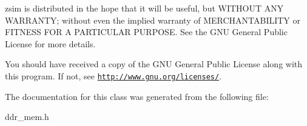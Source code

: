 zsim is distributed in the hope that it will be useful, but W\-I\-T\-H\-O\-U\-T A\-N\-Y W\-A\-R\-R\-A\-N\-T\-Y; without even the implied warranty of M\-E\-R\-C\-H\-A\-N\-T\-A\-B\-I\-L\-I\-T\-Y or F\-I\-T\-N\-E\-S\-S F\-O\-R A P\-A\-R\-T\-I\-C\-U\-L\-A\-R P\-U\-R\-P\-O\-S\-E. See the G\-N\-U General Public License for more details.

You should have received a copy of the G\-N\-U General Public License along with this program. If not, see \href{http://www.gnu.org/licenses/}{\tt http\-://www.\-gnu.\-org/licenses/}. 

The documentation for this class was generated from the following file\-:\begin{DoxyCompactItemize}
\item 
ddr\-\_\-mem.\-h\end{DoxyCompactItemize}
